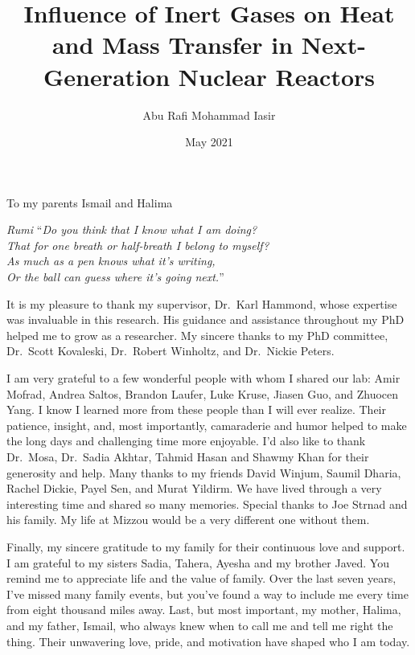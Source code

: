 \documentclass[hyper,dissertation]{MUthesis}
\title{Influence of Inert Gases on Heat and Mass Transfer in Next-Generation Nuclear Reactors}
\author{Abu Rafi Mohammad Iasir}
\date{May 2021}
\begin{document}
\frontmatter   %
\maketitle     %
\copyrightpage %
\approvalpage  %

\begin{dedication}
To my parents Ismail and Halima 
\end{dedication}

\begin{epigraph}{\textit{Rumi}}
``\textit{Do you think that I know what I am doing? \\
  That for one breath or half-breath I belong to myself?\\
  As much as a pen knows what it's writing,\\
  Or the ball can guess where it's going next.}''
\end{epigraph}


\begin{acknowledgments}
It is my pleasure to thank my supervisor, Dr.~Karl Hammond, whose expertise was invaluable in this research. His guidance and assistance throughout my PhD helped me to grow as a researcher. My sincere thanks to my PhD committee, Dr.~Scott Kovaleski, Dr.~Robert Winholtz, and Dr.~Nickie Peters.


I am very grateful to a few wonderful people with whom I shared our lab: Amir Mofrad, Andrea Saltos, Brandon Laufer, Luke Kruse, Jiasen Guo, and Zhuocen Yang. I know I learned more from these people than I will ever realize. Their patience, insight, and, most importantly, camaraderie and humor helped to make the long days and challenging time more enjoyable. I'd also like to thank Dr.~Mosa, Dr.~Sadia Akhtar, Tahmid Hasan and Shawmy Khan for their generosity and help. Many thanks to my friends David Winjum, Saumil Dharia, Rachel Dickie, Payel Sen, and Murat Yildirm. We have lived through a very interesting time and shared so many memories. Special thanks to Joe Strnad and his family. My life at Mizzou would be a very different one without them.

Finally, my sincere gratitude to my family for their continuous love and support. I am grateful to my sisters Sadia, Tahera,  Ayesha and my brother Javed. You remind me to appreciate life and the value of family. Over the last seven years, I've missed many family events, but you've found a way to include me every time from eight thousand miles away. Last, but most important, my mother, Halima, and my father, Ismail, who always knew when to call me and tell me right the thing. Their unwavering love, pride, and motivation have shaped who I am today.
\end{acknowledgments}
\end{document}
